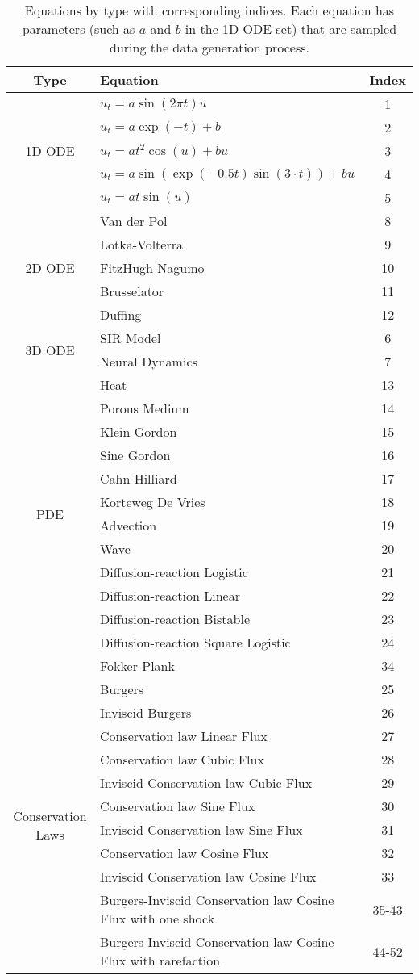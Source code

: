 \documentclass{article}
\begin{document}
\begin{table}[ht]
\centering
\begin{tabular}{|c|l|c|}
\hline
\textbf{Type} & \textbf{Equation} & \textbf{Index} \\
\hline
\multirow{5}{*}{1D ODE} 
& $ u_t = a \sin(2 \pi t)  u $ & 1 \\
& $ u_t = a \exp(-t) + b $ & 2 \\
& $ u_t = a  t^2 \cos(u) + b  u $ & 3 \\
& $ u_t = a \sin(\exp(-0.5 t) \sin(3 \cdot t)) + b  u $ & 4 \\
& $ u_t = a  t \sin(u) $ & 5 \\
\hline
\multirow{5}{*}{2D ODE} 
& Van der Pol & 8 \\
& Lotka-Volterra & 9 \\
& FitzHugh-Nagumo & 10 \\
& Brusselator & 11 \\
& Duffing & 12 \\
\hline
\multirow{2}{*}{3D ODE} 
& SIR Model& 6 \\
& Neural Dynamics& 7 \\
\hline
\multirow{12}{*}{PDE} 
& Heat & 13 \\
& Porous Medium & 14 \\
& Klein Gordon & 15 \\
& Sine Gordon & 16 \\
& Cahn Hilliard & 17 \\
& Korteweg De Vries & 18 \\
& Advection & 19 \\
& Wave & 20 \\
& Diffusion-reaction Logistic & 21 \\
& Diffusion-reaction Linear & 22 \\
& Diffusion-reaction Bistable & 23 \\
& Diffusion-reaction Square Logistic & 24 \\
& Fokker-Plank & 34 \\
\hline
\multirow{18}{*}{Conservation Laws} 
& Burgers & 25 \\
& Inviscid Burgers & 26 \\
& Conservation law Linear Flux & 27 \\
& Conservation law Cubic Flux & 28 \\
& Inviscid Conservation law Cubic Flux & 29 \\
& Conservation law Sine Flux & 30 \\
& Inviscid Conservation law Sine Flux & 31 \\
& Conservation law Cosine Flux & 32 \\
& Inviscid Conservation law Cosine Flux & 33 \\
& Burgers-Inviscid Conservation law Cosine Flux with one shock & 35-43 \\
& Burgers-Inviscid Conservation law Cosine Flux with rarefaction & 44-52 \\
\hline
\end{tabular}
\caption{Equations by type with corresponding indices. Each equation has parameters (such as $a$ and $b$ in the 1D ODE set) that are sampled during the data generation process.}
\label{equations}
\end{table}
\end{document}
